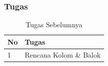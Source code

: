 \documentclass[../main.tex]{subfiles}
\begin{document}
\begin{frame}[mytitle=standard,t,mycolor=digiPH_creamy,dark]
	\frametitle{Tugas}
	\begin{table}[htb]
		\caption{Tugas Sebelumnya}
		\begin{tabularx}{\textwidth}{|p{1cm}|X|}
			\hline
			\textbf{No} & \textbf{Tugas}         \\ \hline
			1           & Rencana Kolom \& Balok \\ \hline
		\end{tabularx}
	\end{table}
\end{frame}




\end{document}
